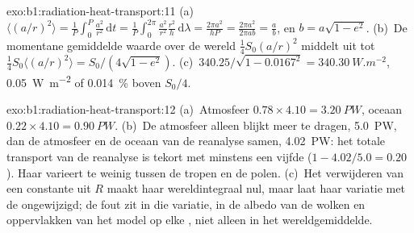 \begin{solution}{exo:b1:radiation-heat-transport:11}
(a)~$\langle (a/r)^2\rangle = \frac1P\int_0^P \frac{a^2}{r^2}\,\mathrm dt =
\frac1P\int_0^{2\pi}\frac{a^2}{r^2}\frac{r^2}{h}\,\mathrm d\lambda = \frac{2\pi
a^2}{hP} = \frac{2\pi a^2}{2\pi a b} = \frac ab$, en $b = a\sqrt{1-e^2}$.
(b)~De momentane gemiddelde waarde over de wereld $\frac14 S_0(a/r)^2$ middelt uit tot $\frac14 S_0
\langle(a/r)^2\rangle = S_0/(4\sqrt{1-e^2})$. (c)~$340.25/\sqrt{1 - 0.0167^2} =
\qty{340.30}{W.m^{-2}}$, \qty{0.05}{W.m^{-2}} of \qty{0.014}{\percent} boven
$S_0/4$.
\end{solution}

\begin{solution}{exo:b1:radiation-heat-transport:12}
(a)~Atmosfeer $0.78 \times 4.10 = \qty{3.20}{PW}$, oceaan $0.22 \times 4.10 =
\qty{0.90}{PW}$. (b)~De atmosfeer alleen blijkt meer te dragen, \qty{5.0}{PW}, dan de atmosfeer en de oceaan van de reanalyse samen, \qty{4.02}{PW}: het totale transport van de reanalyse is tekort met minstens een vijfde ($1 - 4.02/5.0 = 0.20$).
Haar  varieert te weinig tussen de tropen en de polen. (c)~Het verwijderen van een constante uit $R$ maakt haar wereldintegraal nul, maar laat haar variatie met de  ongewijzigd; de fout zit in die variatie, in de albedo van de wolken en oppervlakken van het model op elke , niet alleen in het wereldgemiddelde.
\end{solution}

